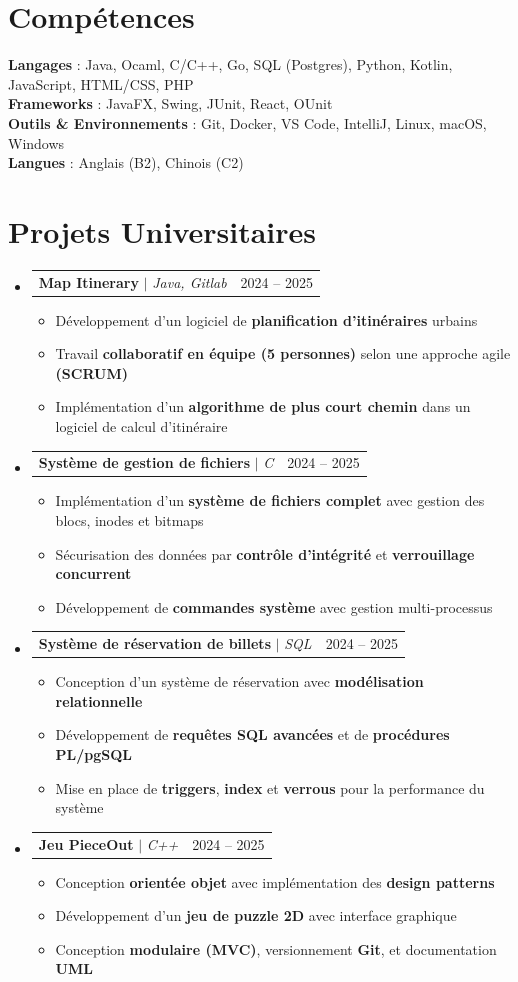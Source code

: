\documentclass[letterpaper,11pt]{article}
\makeatletter
\newcommand{\resumeItem}[1]{
  \item\small{
    {#1 \vspace{-2pt}}
  }
}
\newcommand{\resumeProjectHeading}[2]{
    \item
    \begin{tabular*}{0.97\textwidth}{l@{\extracolsep{\fill}}r}
      \small#1 & #2 \\
    \end{tabular*}\vspace{-7pt}
}
\newcommand{\resumeSubHeadingListStart}{\begin{itemize}[leftmargin=0.15in, label={}]}
\newcommand{\resumeSubHeadingListEnd}{\end{itemize}}
\newcommand{\resumeItemListStart}{\begin{itemize}}
\newcommand{\resumeItemListEnd}{\end{itemize}\vspace{-5pt}}
\makeatother
\begin{document}
\section{Compétences}
 \begin{itemize}[leftmargin=0.15in, label={}]
    \small{\item{
     \textbf{Langages}{ : Java, Ocaml, C/C++, Go, SQL (Postgres), Python, Kotlin, JavaScript, HTML/CSS, PHP} \\
     \textbf{Frameworks}{ : JavaFX, Swing, JUnit, React, OUnit} \\
     \textbf{Outils \& Environnements}{ : Git, Docker, VS Code, IntelliJ, Linux, macOS, Windows} \\
     \textbf{Langues}{ : Anglais (B2), Chinois (C2)} \\
    }}
 \end{itemize}

\section{Projets Universitaires}
    \resumeSubHeadingListStart
      \resumeProjectHeading
          {\textbf{Map Itinerary} $|$ \emph{Java, Gitlab}}{2024 -- 2025}
          \resumeItemListStart
            \resumeItem{Développement d’un logiciel de \textbf{planification d’itinéraires} urbains}
            \resumeItem{Travail \textbf{collaboratif en équipe (5 personnes)} selon une approche agile \textbf{(SCRUM)}}
            \resumeItem{Implémentation d’un \textbf{algorithme de plus court chemin} dans un logiciel de calcul d’itinéraire}
          \resumeItemListEnd
      \resumeProjectHeading
          {\textbf{Système de gestion de fichiers} $|$ \emph{C}}{2024 -- 2025}
          \resumeItemListStart
            \resumeItem{Implémentation d’un \textbf{système de fichiers complet} avec gestion des blocs, inodes et bitmaps}
            \resumeItem{Sécurisation des données par  \textbf{contrôle d’intégrité} et \textbf{verrouillage concurrent}}
            \resumeItem{Développement de  \textbf{commandes système} avec gestion multi-processus}
          \resumeItemListEnd
      \resumeProjectHeading
          {\textbf{Système de réservation de billets} $|$ \emph{SQL}}{2024 -- 2025}
          \resumeItemListStart
            \resumeItem{Conception d’un système de réservation avec \textbf{modélisation relationnelle}}
            \resumeItem{Développement de \textbf{requêtes SQL avancées} et de \textbf{procédures PL/pgSQL}}
            \resumeItem{Mise en place de \textbf{triggers}, \textbf{index} et \textbf{verrous} pour la performance du système}
          \resumeItemListEnd
      \resumeProjectHeading
          {\textbf{Jeu PieceOut} $|$ \emph{C++}}{2024 -- 2025}
          \resumeItemListStart
            \resumeItem{Conception \textbf{orientée objet} avec implémentation des \textbf{design patterns}}
            \resumeItem{Développement d’un \textbf{jeu de puzzle 2D} avec interface graphique}
            \resumeItem{Conception \textbf{modulaire (MVC)}, versionnement \textbf{Git}, et documentation \textbf{UML}}
          \resumeItemListEnd
    \resumeSubHeadingListEnd
\end{document}
